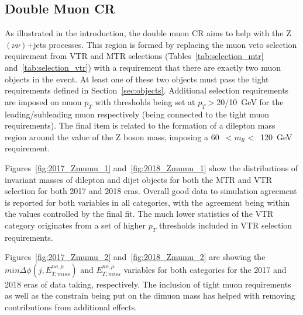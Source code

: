\subsection{Double Muon CR}
\hspace{10pt} As illustrated in the introduction, the double muon CR aims to help with the Z$(\nu\nu)$+jets processes. This region is formed by replacing the muon veto selection requirement from VTR and MTR selections (Tables~\ref{tab:selection_mtr} and~\ref{tab:selection_vtr}) with a requirement that there are exactly two muon objects in the event. At least one of these two objects must pass the tight requirements defined in Section~\ref{sec:objects}. Additional selection requirements are imposed on muon $p_T$ with thresholds being set at $p_T>$20/10~GeV for the leading/subleading muon respectively (being connected to the tight muon requirements). The final item is related to the formation of a dilepton mass region around the value of the Z boson mass, imposing a 60~$<m_{ll}<$~120~GeV requirement.

\hspace{10pt} Figures~\ref{fig:2017_Zmumu_1} and~\ref{fig:2018_Zmumu_1} show the distributions of invariant masses of dilepton and dijet objects for both the MTR and VTR selection for both 2017 and 2018 eras. Overall good data to simulation agreement is reported for both variables in all categories, with the agreement being within the values controlled by the final fit. The much lower statistics of the VTR category originates from a set of higher $p_T$ thresholds included in VTR selection requirements.

\hspace{10pt} Figures~\ref{fig:2017_Zmumu_2} and~\ref{fig:2018_Zmumu_2} are showing the $min\Delta\phi(j, E_{T,miss}^{no,\mu})$ and $E_{T,miss}^{no,\mu}$ variables for both categories for the 2017 and 2018 eras of data taking, respectively. The inclusion of tight muon requirements as well as the constrain being put on the dimuon mass has helped with removing contributions from additional effects.

